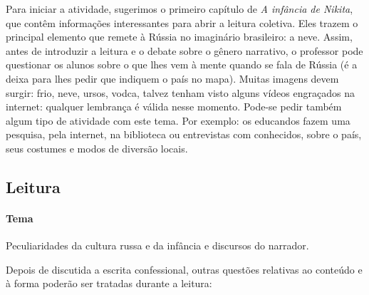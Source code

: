\documentclass{article}
\begin{document}
Para iniciar a atividade, sugerimos o primeiro capítulo de \emph{A
infância de Nikita}, que contêm informações interessantes para abrir a
leitura coletiva. Eles trazem o principal elemento que remete à Rússia
no imaginário brasileiro: a neve. Assim, antes de introduzir a leitura e
o debate sobre o gênero narrativo, o professor pode questionar os alunos
sobre o que lhes vem à mente quando se fala de Rússia (é a deixa para
lhes pedir que indiquem o país no mapa). Muitas imagens devem surgir:
frio, neve, ursos, vodca, talvez tenham visto alguns vídeos engraçados
na internet: qualquer lembrança é válida nesse momento. Pode-se pedir
também algum tipo de atividade com este tema. Por exemplo: os educandos
fazem uma pesquisa, pela internet, na biblioteca ou entrevistas com
conhecidos, sobre o país, seus costumes e modos de diversão locais.

\subsection{Leitura}

\paragraph{Tema} Peculiaridades da cultura russa e da infância e
discursos do narrador.

Depois de discutida a escrita confessional, outras questões relativas ao
conteúdo e à forma poderão ser tratadas durante a leitura:
\end{document}
